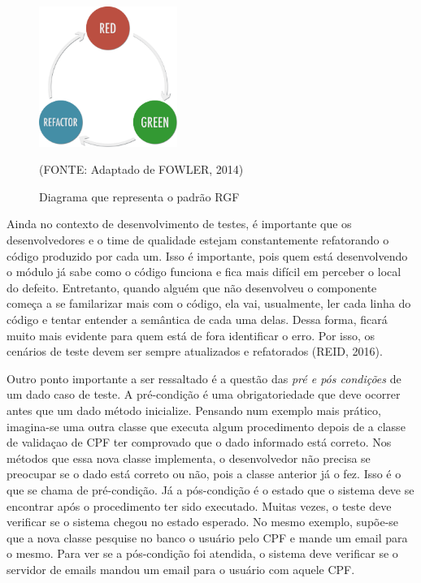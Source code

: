 \documentclass[
    12pt,       %
    openright,      %
    twoside,      %
    a4paper,      %
    english,      %
    french,       %
    spanish,      %
    brazil,       %
    ]{abntex2}
\begin{document}
      \begin{figure}[htbp]
          \begin{center}
              \includegraphics[width=0.4\textwidth]{img/rgf.png}
          \end{center}
          \caption{\label{fig:passaro}Diagrama que representa o padrão RGF}
          \begin{center}(FONTE: Adaptado de FOWLER, 2014)\end{center}
      \end{figure}

      Ainda no contexto de desenvolvimento de testes, é importante que os desenvolvedores
      e o time de qualidade estejam constantemente refatorando o código produzido por
      cada um. Isso é importante, pois quem está desenvolvendo o módulo já sabe como
      o código funciona e fica mais difícil em perceber o local do defeito. Entretanto,
      quando alguém que não desenvolveu o componente começa a se familarizar mais com o código,
      ela vai, usualmente, ler cada linha do código e tentar entender a semântica de cada
      uma delas. Dessa forma, ficará muito mais evidente para quem está de fora identificar
      o erro. Por isso, os cenários de teste devem ser sempre atualizados e refatorados
      (REID, 2016).

      Outro ponto importante a ser ressaltado é a questão das \textit{pré e pós condições} de
      um dado caso de teste. A pré-condição é uma obrigatoriedade que deve ocorrer
      antes que um dado método inicialize. Pensando num exemplo mais prático,
      imagina-se uma outra classe que executa algum procedimento depois de a classe
      de validaçao de CPF ter comprovado que o dado informado está correto. Nos métodos
      que essa nova classe implementa, o desenvolvedor não precisa se preocupar se o
      dado está correto ou não, pois a classe anterior já o fez. Isso é o que se chama
      de pré-condição. Já a pós-condição é o estado que o sistema deve se encontrar
      após o procedimento ter sido executado. Muitas vezes, o teste deve verificar
      se o sistema chegou no estado esperado. No mesmo exemplo, supõe-se que a nova
      classe pesquise no banco o usuário pelo CPF e mande um email para o mesmo. Para
      ver se a pós-condição foi atendida, o sistema deve verificar se o servidor de
      emails mandou um email para o usuário com aquele CPF.
\end{document}
